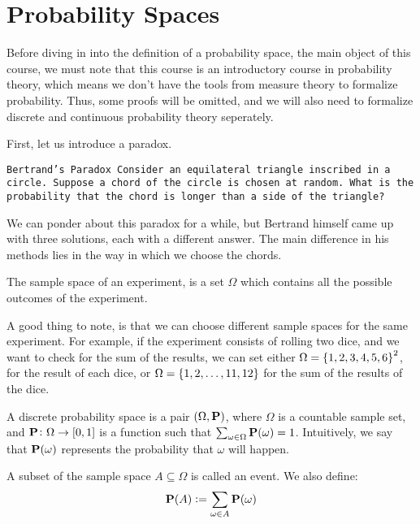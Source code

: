 \documentclass[11pt,a4paper]{article}
\begin{document}
	\maketitle


	\newpage
  \tableofcontents
  \newpage

  \section{Probability Spaces}
  Before diving in into the definition of a probability space, the main object
  of this course, we must note that this course is an introductory course in 
  probability theory, which means we don't have the tools from measure theory
  to formalize probability. Thus, some proofs will be omitted, and we will
  also need to formalize discrete and continuous probability theory seperately.

  First, let us introduce a paradox.
  \begin{paradox}
    \tt{Bertrand's Paradox}\label{par:ber}
    Consider an equilateral triangle inscribed in a circle. 
    Suppose a chord of the circle is chosen at random. 
    What is the probability that the chord is longer than a side of the 
    triangle? 
  \end{paradox}

  We can ponder about this paradox for a while, but Bertrand himself came up
  with three solutions, each with a different answer. The main difference in
  his methods lies in the way in which we choose the chords.

  \begin{definition}
    The sample space of an experiment, is a set $\Omega$ which contains all
    the possible outcomes of the experiment.
  \end{definition}

  A good thing to note, is that we can choose different sample spaces for the
  same experiment. For example, if the experiment consists of rolling two
  dice, and we want to check for the sum of the results, we can set either
  $\Omega = \set{1,2,3,4,5,6}^2$, for the result of each dice, or 
  $\Omega = \set{1,2,\dots,11,12}$ for the sum of the results of the dice. 

  \begin{definition}
    A discrete probability space is a pair $(\Omega, \mathbf{P})$, where
    $\Omega$ is a countable sample set, and $\mathbf{P} \colon \Omega \to 
    [0,1]$ is a function such that 
    $\sum_{\omega \in \Omega}{\mathbf{P}(\omega)} = 1$. 
    Intuitively, we say that $\mathbf{P}(\omega)$ represents the probability
    that $\omega$ will happen.
  \end{definition}
  \begin{definition}
    A subset of the sample space $A \subseteq \Omega$ is called an event.
    We also define:
    \[
      \mathbf{P}(A) := \sum_{\omega \in A}{\mathbf{P}(\omega)}
    \]
  \end{definition}
  
\end{document}
